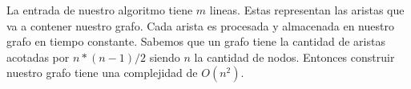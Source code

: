 La entrada de nuestro algoritmo tiene $m$ lineas. Estas representan las aristas que va a contener nuestro grafo. Cada arista es procesada y almacenada en nuestro grafo en tiempo constante. Sabemos que un grafo tiene la cantidad de aristas acotadas por $n*(n-1)/2$ siendo $n$ la cantidad de nodos. Entonces construir nuestro grafo tiene una complejidad de $O(n^2)$.

